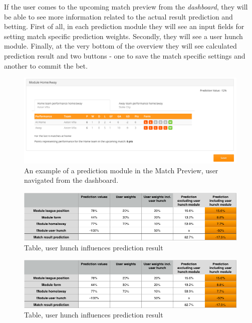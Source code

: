 If the user comes to the upcoming match preview from the \emph{dashboard}, they will be able to see more information related to the actual result prediction and betting.
First of all, in each prediction module they will see an input fields for setting match specific prediction weights. Secondly, they will see a user hunch module. Finally, at the very bottom of the overview they will see calculated prediction result and two buttons - one to save the match specific settings and another to commit the bet.

\begin{figure}[H]
\begin{center}
\includegraphics[width=.90\linewidth,natwidth=610,natheight=642]{impl/images/matchoverviewex_from_main_page}
\caption{An example of a prediction module in the Match Preview, user navigated from the dashboard.} \label{fig:using: matchoverviewex_from_main_page}
\end{center}
\end{figure}


 
\begin{figure}[H]
\begin{center}
\includegraphics[width=.90\linewidth,natwidth=610,natheight=642]{impl/images/hunchinfluence}
\caption{Table, user hunch influences prediction result} \label{fig:using:footballapiwrapperfields}
\end{center}
\end{figure}


\begin{figure}[H]
\begin{center}
\includegraphics[width=.90\linewidth,natwidth=610,natheight=642]{impl/images/hunchinfluence}
\caption{Table, user hunch influences prediction result} \label{fig:using:footballapiwrapperfields}
\end{center}
\end{figure}

